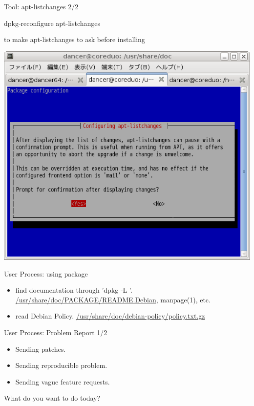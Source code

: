 \documentclass[cjk,dvipdfm,12pt]{beamer}
\begin{document}
\begin{frame}[containsverbatim]{Tool: apt-listchanges 2/2}
 \begin{minipage}{0.49\hsize}

 \begin{commandline}
  dpkg-reconfigure apt-listchanges
 \end{commandline} 
 to make apt-listchanges to ask before installing

 \includegraphics[width=1\hsize]{image200805/apt-listchanges-qa.png}
 \end{minipage}
\end{frame}

\begin{frame}{User Process: using package}
\begin{itemize}
 \item find documentation through 'dpkg -L '.
       \url{/usr/share/doc/PACKAGE/README.Debian}, manpage(1), etc.
 \item read Debian Policy. 
       \url{/usr/share/doc/debian-policy/policy.txt.gz}
\end{itemize}
\end{frame}

\begin{frame}{User Process: Problem Report 1/2}
\begin{itemize}
 \item Sending patches.
 \item Sending reproducible problem.
 \item Sending vague feature requests.
\end{itemize}

What do you want to do today?
\end{frame}
\end{document}
